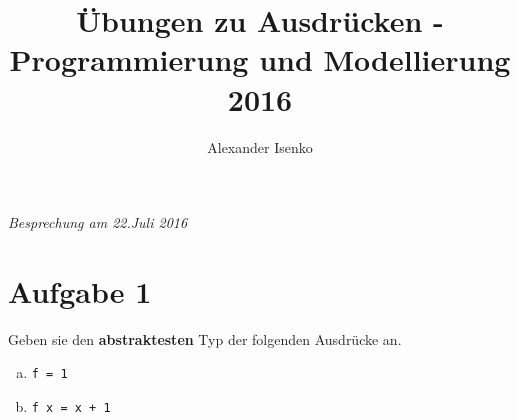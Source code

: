 \documentclass{article}
\title{Übungen zu Ausdrücken - Programmierung und Modellierung 2016}
\author{Alexander Isenko}
\begin{document}
\maketitle

\begin{center}
\textit{Besprechung am 22.Juli 2016}
\end{center}

\section*{Aufgabe 1}
Geben sie den \textbf{abstraktesten} Typ der folgenden Ausdrücke an. 
\begin{enumerate} [a)]
    \item \begin{verbatim}
f = 1
          \end{verbatim}
    \item \begin{verbatim}
f x = x + 1
          \end{verbatim}


\end{enumerate}
\end{document}
